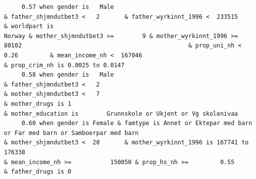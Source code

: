 \documentclass[
  letterpaper,
  DIV=11,
  numbers=noendperiod]{scrreprt}
\begin{document}
\begin{verbatim}
     0.57 when gender is   Male                                                                               & father_shjmndutbet3 <   2       & father_wyrkinnt_1996 <  233515           & worldpart is                                                                                                                              Norway & mother_shjmndutbet3 >=        9 & mother_wyrkinnt_1996 >=            80102                                               & prop_uni_nh <  0.26         & mean_income_nh <  167046                                        & prop_crim_nh is 0.0025 to 0.0147                                                                                                                                                                                                                                                                            
     0.58 when gender is   Male                                                                               & father_shjmndutbet3 <   2                                                                                                                                                                                                     & mother_shjmndutbet3 <   7                                                  & mother_drugs is 1                                                                                                                                                                                                  & mother_education is        Grunnskole or Ukjent or Vg skolenivaa                                                                                                                                                                     
     0.60 when gender is Female & famtype is Annet or Ektepar med barn or Far med barn or Samboerpar med barn                                                                                                                                                                                                                                 & mother_shjmndutbet3 <  20       & mother_wyrkinnt_1996 is 167741 to 176338                                                                             & mean_income_nh >=           150050 & prop_hs_nh >=         0.55                                                                                                                                                                                                 & father_drugs is 0                                                                                           

\end{verbatim}
\end{document}
